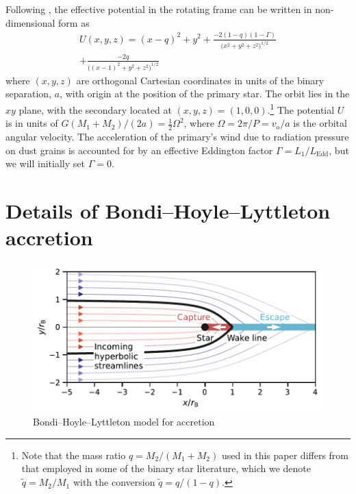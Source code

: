 \documentclass[useAMS, usenatbib, a4paper]{mnras}
\newcommand\orb{\ensuremath{_{\mathrm{o}}}}
\newcommand\qq{\ensuremath{\tilde{q}}}
\begin{document}
Following \citet{Seidov:2004a},
the effective potential in the rotating frame
can be written in non-dimensional form as
\begin{multline}
  \label{eq:effective-potential}
  U(x, y, z) = (x - q)^2 + y^2               %
  + \frac{-2 (1 - q) (1 - \Gamma)}{\bigl(x^2 + y^2 + z^2\bigr)^{1/2}} \\ %
  + \frac{-2 q}{\bigl((x-1)^2 + y^2 + z^2\bigr)^{1/2}}   %
\end{multline}
where \((x, y, z)\) are orthogonal Cartesian coordinates
in units of the binary separation, \(a\),
with origin at the position of the primary star. The orbit lies in the \(xy\) plane,
with the secondary located at \((x, y, z) = (1, 0, 0)\).\footnote{%
  Note that the mass ratio \(q = M_2 / (M_1 + M_2)\) used in this paper differs from that
  employed in some of the binary star literature, which we denote \(\qq = M_2 / M_1\)
  with the conversion \(\qq = q / (1 - q)\).
}
The potential \(U\) is in units of \(G (M_1 + M_2) / (2 a) = \frac12 \Omega^2\), where \(\Omega = 2 \pi / P = v\orb / a\) is the orbital angular velocity.
The acceleration of the primary's wind due to radiation pressure on dust grains is
accounted for by an effective Eddington factor \(\Gamma = L_1 / L_{\mathrm{Edd}}\), but we will initially set \(\Gamma = 0\). 




\appendix

\section{Details of Bondi--Hoyle--Lyttleton accretion}
\label{sec:deta-hoyle-lyttl}
\begin{figure}
  \centering
  \includegraphics[width=\linewidth]{notebooks/hoyle-lyttleton-trajectories}
  \caption{Bondi--Hoyle--Lyttleton model for accretion}
  \label{fig:bhl}
\end{figure}
\end{document}
